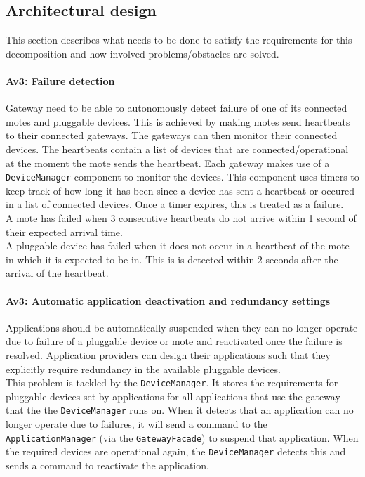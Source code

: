 \subsection{Architectural design}\label{sec:architectural-design}
    This section describes what needs to be done to satisfy the requirements for
    this decomposition and how involved problems/obstacles are solved.

    \paragraph{Av3: Failure detection}
        Gateway need to be able to autonomously detect failure of one of its
        connected motes and pluggable devices. This is achieved by making motes
        send heartbeats to their connected gateways. The gateways can
        then monitor their connected devices. The heartbeats contain a list
        of devices that are connected/operational at the moment the mote sends
        the heartbeat. Each gateway makes use of a \texttt{DeviceManager}
        component to monitor the devices. This component uses timers to keep track
        of how long it has been since a device has sent a heartbeat or occured in
        a list of connected devices. Once a timer expires, this is treated as
        a failure. \\

        A mote has failed when 3 consecutive heartbeats do not arrive within 1
        second of their expected arrival time. \\
        A pluggable device has failed when it does not occur in a heartbeat of the
        mote in which it is expected to be in. This is is detected within 2
        seconds after the arrival of the heartbeat.

    \paragraph{Av3: Automatic application deactivation and redundancy settings}
        Applications should be automatically suspended when they can no longer
        operate due to failure of a pluggable device or mote and reactivated
        once the failure is resolved. Application providers can design their
        applications such that they explicitly require redundancy in
        the available pluggable devices. \\
        This problem is tackled by the \texttt{DeviceManager}. It
        stores the requirements for pluggable devices set by applications for all
        applications that use the gateway that the the \texttt{DeviceManager}
        runs on. When it detects that an application can no longer operate
        due to failures, it will send a command to the \texttt{ApplicationManager}
        (via the \texttt{GatewayFacade})
        to suspend that application. When the required devices are operational
        again, the \texttt{DeviceManager} detects this and sends a
        command to reactivate the application. \\

